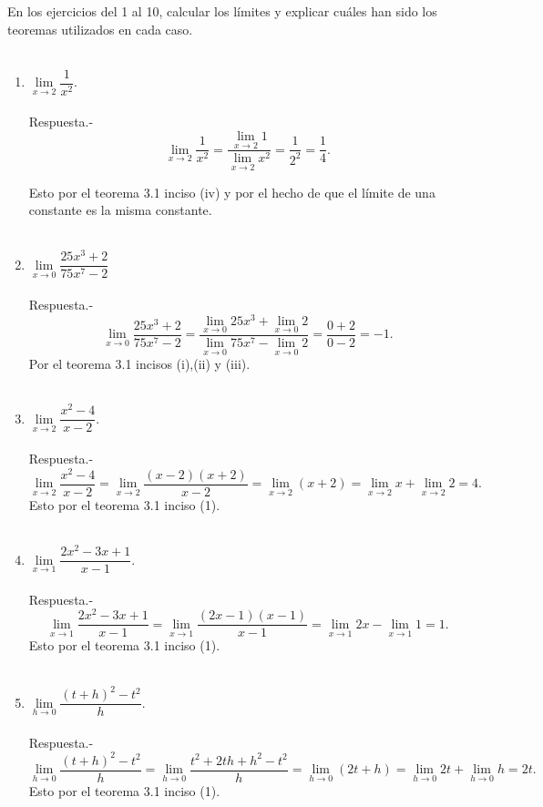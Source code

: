 En los ejercicios del 1 al 10, calcular los límites y explicar cuáles han sido los teoremas utilizados en cada caso.\\\\

\begin{enumerate}[\bfseries 1.]

    \item $\lim\limits_{x\to 2}\dfrac{1}{x^2}.$\\\\
	Respuesta.-\; 
	$$\lim\limits_{x\to 2}\dfrac{1}{x^2} = \dfrac{\lim\limits_{x\to 2}1}{\lim\limits_{x\to 2}x^2} = \dfrac{1}{2^2}=\dfrac{1}{4}.$$

	Esto por el teorema 3.1 inciso (iv) y por el hecho de que el límite de una constante es la misma constante.\\\\

    \item $\lim\limits_{x\to 0} \dfrac{25x^3+2}{75x^7-2}$\\\\
	Respuesta.-\; 
	$$\lim\limits_{x\to 0} \dfrac{25x^3+2}{75x^7-2}=\dfrac{\lim\limits_{x\to 0}25x^3+\lim\limits_{x\to 0}2}{\lim\limits_{x\to 0}75x^7-\lim\limits_{x\to 0}2} = \dfrac{0 + 2}{0-2}=-1.$$
	Por el teorema 3.1 incisos (i),(ii) y (iii).\\\\

    \item $\lim\limits_{x\to 2}\dfrac{x^2-4}{x-2}$.\\\\
	Respuesta.-\; 
	$$\lim\limits_{x\to 2}\dfrac{x^2-4}{x-2} = \lim_{x\to 2}\dfrac{(x-2)(x+2)}{x-2}=\lim_{x\to 2}(x+2) = \lim_{x\to 2} x + \lim_{x\to 2}2 = 4.$$
	Esto por el teorema 3.1 inciso (1).\\\\

    \item $\lim\limits_{x\to 1}\dfrac{2x^2-3x+1}{x-1}$.\\\\
	Respuesta.-\; 
	$$\lim\limits_{x\to 1}\dfrac{2x^2-3x+1}{x-1} = \lim_{x\to 1}\dfrac{(2x-1)(x-1)}{x-1}=\lim_{x\to 1} 2x - \lim_{x\to 1} 1 = 1.$$
	Esto por el teorema 3.1 inciso (1).\\\\

    \item $\lim\limits_{h\to 0}\dfrac{(t+h)^2-t^2}{h}.$\\\\
	Respuesta.-\; 
	$$\lim\limits_{h\to 0}\dfrac{(t+h)^2-t^2}{h} = \lim_{h\to 0}\dfrac{t^2+2th+h^2-t^2}{h}=\lim_{h \to 0} (2t+h) = \lim_{h\to 0}2t + \lim_{h\to 0}h = 2t.$$
	Esto por el teorema 3.1 inciso (1).\\\\


\end{enumerate}
